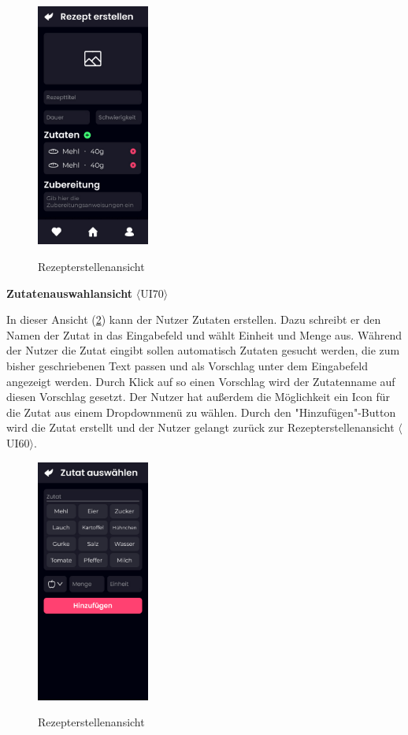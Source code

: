 \documentclass[parskip=full]{scrartcl}
\begin{document}
\begin{figure}[!htp]
    \centering
    \includegraphics[height=80mm]{images/section7/RecipeCreationView.jpg}
    \label{fig:A77}
    \caption{Rezepterstellenansicht}
\end{figure}

\textbf{Zutatenauswahlansicht} $\langle$UI70$\rangle$

In dieser Ansicht (\ref{fig:A78}) kann der Nutzer Zutaten erstellen. Dazu schreibt er den Namen der Zutat in das Eingabefeld und wählt Einheit und Menge aus. Während der Nutzer die Zutat eingibt sollen automatisch Zutaten gesucht werden, die zum bisher geschriebenen Text passen und als Vorschlag unter dem Eingabefeld angezeigt werden. Durch Klick auf so einen Vorschlag wird der Zutatenname auf diesen Vorschlag gesetzt. Der Nutzer hat außerdem die Möglichkeit ein Icon für die Zutat aus einem Dropdownmenü zu wählen. Durch den "Hinzufügen"-Button wird die Zutat erstellt und der Nutzer gelangt zurück zur Rezepterstellenansicht $\langle$UI60$\rangle$.

\begin{figure}[!htp]
    \centering
    \includegraphics[height=80mm]{images/section7/IngredientPickerView.jpg}
    \label{fig:A78}
    \caption{Rezepterstellenansicht}
\end{figure}
\end{document}
